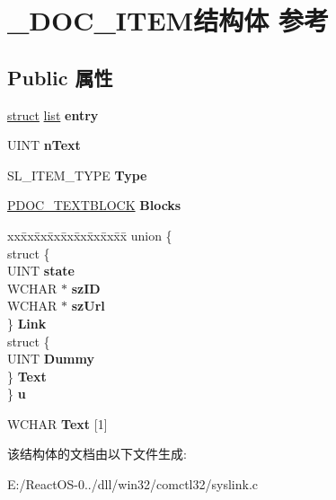 \hypertarget{struct___d_o_c___i_t_e_m}{}\section{\+\_\+\+D\+O\+C\+\_\+\+I\+T\+E\+M结构体 参考}
\label{struct___d_o_c___i_t_e_m}
\subsection*{Public 属性}
\begin{DoxyCompactItemize}
\item 
\mbox{\label{struct___d_o_c___i_t_e_m_a71bedb4b7d8c0270958a97f14dc542ce}} 
\hyperlink{interfacestruct}{struct} \hyperlink{classlist}{list} {\bfseries entry}
\item 
\mbox{\label{struct___d_o_c___i_t_e_m_afb3fd4b20722373e42b9e496ab1add62}} 
U\+I\+NT {\bfseries n\+Text}
\item 
\mbox{\label{struct___d_o_c___i_t_e_m_a6904822e4f06d682cdaa920dfcd3eabf}} 
S\+L\+\_\+\+I\+T\+E\+M\+\_\+\+T\+Y\+PE {\bfseries Type}
\item 
\mbox{\label{struct___d_o_c___i_t_e_m_a9173692ed66670d6f8c72967dac763fd}} 
\hyperlink{struct_d_o_c___t_e_x_t_b_l_o_c_k}{P\+D\+O\+C\+\_\+\+T\+E\+X\+T\+B\+L\+O\+CK} {\bfseries Blocks}
\item 
\mbox{\label{struct___d_o_c___i_t_e_m_a86c9990662d9a4d22074126c281e7f07}} 
\begin{tabbing}
xx\=xx\=xx\=xx\=xx\=xx\=xx\=xx\=xx\=\kill
union \{\\
\>struct \{\\
\>\>UINT {\bfseries state}\\
\>\>WCHAR $\ast$ {\bfseries szID}\\
\>\>WCHAR $\ast$ {\bfseries szUrl}\\
\>\} {\bfseries Link}\\
\>struct \{\\
\>\>UINT {\bfseries Dummy}\\
\>\} {\bfseries Text}\\
\} {\bfseries u}\\

\end{tabbing}\item 
\mbox{\label{struct___d_o_c___i_t_e_m_aa1db24340b40d51133222f26d11e9add}} 
W\+C\+H\+AR {\bfseries Text} \mbox{[}1\mbox{]}
\end{DoxyCompactItemize}


该结构体的文档由以下文件生成\+:\begin{DoxyCompactItemize}
\item 
E\+:/\+React\+O\+S-\/0../dll/win32/comctl32/syslink.\+c\end{DoxyCompactItemize}
